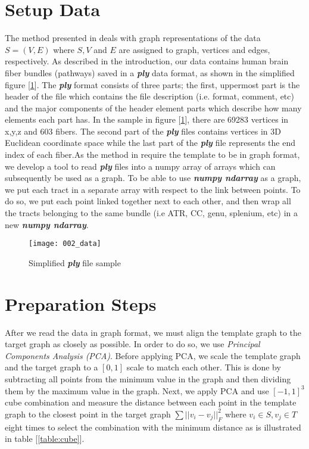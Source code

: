 \documentclass[../structure.tex]{subfiles}
\begin{document}
\section{Setup Data}
The method presented in \cite{Amberg2007} deals with graph representations of the data $S=(V,E)$ where $S,V$ and $E$ are assigned to graph, vertices and edges, respectively. As described in the introduction, our data contains human brain fiber bundles (pathways) saved in a \textbf{\textit{ply}} data format, as shown in the simplified figure [\ref{fig:data}]. The \textbf{\textit{ply}} format consists of three parts; the first, uppermost part is the header of the file which contains the file description (i.e. format, comment, etc) and the major components of the header element parts which describe how many elements each part has. In the sample in figure [\ref{fig:data}], there are 69283 vertices in x,y,z and 603 fibers. The second part of the \textbf{\textit{ply}} files contains vertices in 3D Euclidean coordinate space while the last part of the \textbf{\textit{ply}} file represents the end index of each fiber.As the method in \cite{Amberg2007} require the template to be in graph format, we develop a tool to read \textbf{\textit{ply}} files into a numpy array of arrays which can subsequently be used as a graph. To be able to use \textbf{\textit{numpy ndarray}} as a graph, we put each tract in a separate array with respect to the link between points. To do so, we put each point linked together next to each other, and then wrap all the tracts belonging to the same bundle (i.e ATR, CC, genu, splenium, etc) in a new \textbf{\textit{numpy ndarray}}.

\begin{figure}[h]
\centering
\texttt{[image: 002\_data]}
\captionsetup{justification=centering}
\caption{Simplified \textbf{\textit{ply}} file sample}
\label{fig:data}
\end{figure}

\section{Preparation Steps}
After we read the data in graph format, we must align the template graph to the target graph as closely as possible. In order to do so, we use \textit{Principal Components Analysis (PCA)}. Before applying PCA, we scale the template graph and the target graph to a $[0,1]$ scale to match each other. This is done by subtracting all points from the minimum value in the graph and then dividing them by the maximum value in the graph. Next, we apply PCA and use $[-1,1]^3$ cube combination and measure the distance between each point in the template graph to the closest point in the target graph $\sum ||v_i-v_j||_F^2$ where $v_i \in S, v_j \in T$ eight times to select the combination with the minimum distance as is illustrated in table [\ref{table:cube}].
\end{document}
